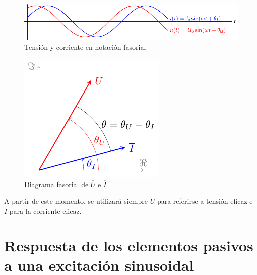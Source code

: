 \documentclass[11pt]{book} %
\begin{document}
	\begin{figure}[htbp]
		\centering
		\includegraphics[width=.9\linewidth]{../figs/ondasTensionCorriente.pdf}
		\caption{Tensión y corriente en notación fasorial}
		\label{fig.ondasTensionCorriente}
	\end{figure}
	
	
	\begin{figure}[htbp]
		\centering
		\includegraphics[width=0.3\linewidth]{../figs/fasorTensionCorriente.pdf}
		\caption{Diagrama fasorial de $\overline{U}$ e  $\overline{I}$}
		\label{fig.fasortensioncorriente}
	\end{figure}
	
	\begin{remark}
		A partir de este momento, se utilizará siempre $U$ para referirse a tensión eficaz e $I$ para la corriente eficaz.
	\end{remark}
	
	\section{Respuesta de los elementos pasivos a una excitación sinusoidal}
	
		
\end{document}

